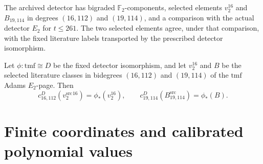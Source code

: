 \begin{definition}
\label{sem:Computation:detector-comparison}
The archived detector has bigraded $\mathbb F_2$-components, selected elements $v_2^{16}$ and $B_{19,114}$ in degrees $(16,112)$ and $(19,114)$, and a comparison with the actual detector $E_2$ for $t\leq261$. The two selected elements agree, under that comparison, with the fixed literature labels transported by the prescribed detector isomorphism.

Let $\phi:\mathrm{tmf}\cong D$ be the fixed detector isomorphism, and let $v_2^{16}$ and $B$ be the selected literature classes in bidegrees $(16,112)$ and $(19,114)$ of the $\mathrm{tmf}$ Adams $E_2$-page. Then
\[c^D_{16,112}(v^{\mathrm{src}}_2{}^{16})=\phi_*(v_2^{16}),\qquad c^D_{19,114}(B^{\mathrm{src}}_{19,114})=\phi_*(B).\]
\end{definition}


\section{Finite coordinates and calibrated polynomial values}


